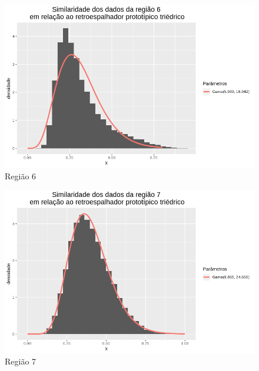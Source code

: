 \documentclass[12pt]{article}
\begin{document}
\begin{figure}[!h]
    \centering
    \vspace{0.05\linewidth}
    \includegraphics[width = 0.95\linewidth]{../../Images/Report_18_12_17/tri_region6.png}
    \caption{Região 6}
    \label{fig:tri_r6}
\end{figure}

\begin{figure}[!h]
    \centering
    \vspace{0.1\linewidth}
    \includegraphics[width = 0.95\linewidth]{../../Images/Report_18_12_17/tri_region7.png}
    \caption{Região 7}
    \label{fig:tri_r7}
\end{figure}
\end{document}
